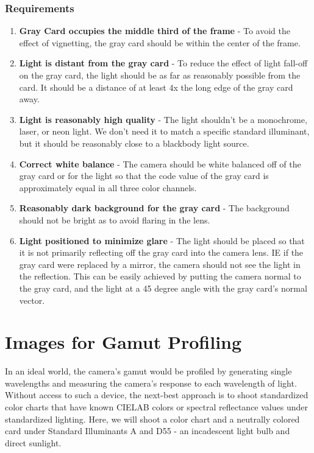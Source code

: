 \documentclass[twoside]{article}
\begin{document}
\subsubsection{Requirements}
\begin{enumerate}
    \item \textbf{Gray Card occupies the middle third of the frame} - To avoid the effect of vignetting, the gray card should be within the center of the frame.
    \item \textbf{Light is distant from the gray card} - To reduce the effect of light fall-off on the gray card, the light should be as far as reasonably possible from the card. It should be a distance of at least 4x the long edge of the gray card away.
    \item \textbf{Light is reasonably high quality} - The light shouldn't be a monochrome, laser, or neon light. We don't need it to match a specific standard illuminant, but it should be reasonably close to a blackbody light source.
    \item \textbf{Correct white balance} - The camera should be white balanced off of the gray card or for the light so that the code value of the gray card is approximately equal in all three color channels.
    \item \textbf{Reasonably dark background for the gray card} - The background should not be bright as to avoid flaring in the lens.
    \item \textbf{Light positioned to minimize glare} - The light should be placed so that it is not primarily reflecting off the gray card into the camera lens. IE if the gray card were replaced by a mirror, the camera should not see the light in the reflection. This can be easily achieved by putting the camera normal to the gray card, and the light at a 45 degree angle with the gray card's normal vector.
\end{enumerate}

\section{Images for Gamut Profiling}
In an ideal world, the camera's gamut would be profiled by generating single wavelengths and measuring the camera's response to each wavelength of light. Without access to such a device, the next-best approach is to shoot standardized color charts that have known CIELAB colors or spectral reflectance values under standardized lighting. Here, we will shoot a color chart and a neutrally colored card under Standard Illuminants A and D55 - an incadescent light bulb and direct sunlight.
\end{document}
